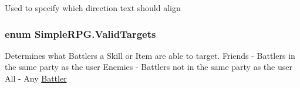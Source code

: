 Used to specify which direction text should align 

\hypertarget{namespace_simple_r_p_g_af69ad1f922e177c5a1cd81b2c0f2c8ce}{
\subsubsection[{Valid\-Targets}]{\setlength{\rightskip}{0pt plus 5cm}enum {\bf Simple\-R\-P\-G.\-Valid\-Targets}}}\label{namespace_simple_r_p_g_af69ad1f922e177c5a1cd81b2c0f2c8ce}


Determines what Battlers a Skill or Item are able to target. Friends -\/ Battlers in the same party as the user Enemies -\/ Battlers not in the same party as the user All -\/ Any \hyperlink{class_simple_r_p_g_1_1_battler}{Battler} 

